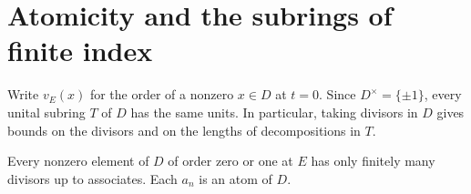 \section{Atomicity and the subrings of finite index}
\label{sec:orders}

Write $v_E(x)$ for the order of a nonzero $x \in D$ at $t = 0$.
Since $D^{\times} = \{\pm 1\}$, every unital subring $T$ of $D$ has the same units.
In particular, taking divisors in $D$ gives bounds on the divisors and on the lengths of decompositions in $T$.

\begin{lemma}
    \label{lem:low-order}
    Every nonzero element of $D$ of order zero or one at $E$ has only finitely many divisors up to associates.
    Each $a_n$ is an atom of $D$.
\end{lemma}

